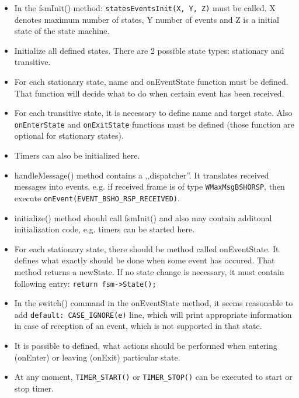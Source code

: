 \begin{itemize}
\item In the fsmInit() method: \verb+statesEventsInit(X, Y, Z)+ must be
  called. X denotes maximum number of states, Y number of events and Z
  is a initial state of the state machine.
\item Initialize all defined states. There are 2 possible state types:
  stationary and transitive.
\item For each stationary state, name and onEventState function must
  be defined. That function will decide what to do when certain event
  has been received.
\item For each transitive state, it is necessary to define name and
  target state. Also \verb+onEnterState+ and \verb+onExitState+
  functions must be defined (those function are optional for
  stationary states).
\item Timers can also be initialized here.
\item handleMessage() method contains a ,,dispatcher''. It translates
  received messages into events, e.g. if received frame is of type
  \verb+WMaxMsgBSHORSP+, then execute
  \verb+onEvent(EVENT_BSHO_RSP_RECEIVED)+.
\item initialize() method should call fsmInit() and also may contain
  additonal initialization code, e.g. timers can be started here.
\item For each stationary state, there should be method called
  onEventState. It defines what exactly should be done when some event
  has occured. That method returns a newState. If no state change is
  necessary, it must contain following entry:
  \verb+return fsm->State();+
\item In the switch() command in the onEventState method, it seems
  reasonable to add \verb+default: CASE_IGNORE(e)+ line, which will
  print appropriate information in case of reception of an event,
  which is not supported in that state.
\item It is possible to defined, what actions should be performed when
  entering (onEnter) or leaving (onExit) particular state.
\item At any moment, \verb+TIMER_START()+ or \verb+TIMER_STOP()+ can
  be executed to start or stop timer.
\end{itemize}

